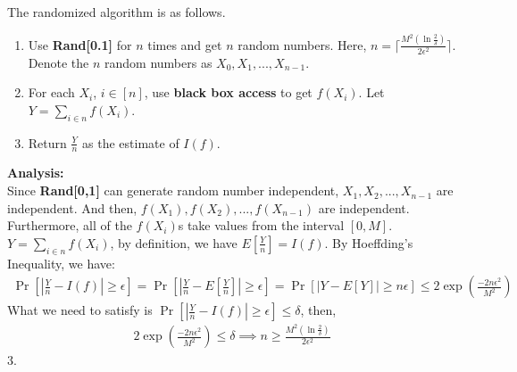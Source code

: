 The randomized algorithm is as follows.
\begin{enumerate}
    \item Use \textbf{Rand[0.1]} for $n$ times and get $n$ random numbers.
    Here, $n=\lceil \frac{M^2(\ln \frac{2}{\delta})}{2\epsilon^2}\rceil $.
    Denote the $n$ random numbers as $X_0, X_1, ..., X_{n-1}$.
    \item For each $X_i$, $i\in [n]$, use \textbf{black box access} to get $f(X_i)$.
    Let $Y=\sum_{i\in n}f(X_i)$.
    \item Return $\frac{Y}{n}$ as the estimate of $I(f)$.
\end{enumerate}
\textbf{Analysis:}\\
Since \textbf{Rand[0,1]} can generate random number independent,
$X_1, X_2,..., X_{n-1}$ are independent.
And then, $f(X_1), f(X_2),..., f(X_{n-1})$ are independent.
Furthermore, all of the $f(X_i)$s take values from the interval $[0, M]$.
$Y=\sum_{i\in n}f(X_i)$, by definition, we have $E[\frac{Y}{n}]=I(f)$.
By Hoeffding's Inequality, we have:
\begin{align}
    \nonumber \Pr[|\frac{Y}{n}-I(f)|\ge\epsilon]=\Pr[|\frac{Y}{n}-E[\frac{Y}{n}]|\ge\epsilon]
    =\Pr[|Y-E[Y]|\ge n\epsilon]\le 2\exp({\frac{-2n\epsilon^2}{M^2}})
\end{align}
What we need to satisfy is $\Pr[|\frac{Y}{n}-I(f)|\ge\epsilon]\le \delta$, then,
\begin{align}
    \nonumber 2\exp({\frac{-2n\epsilon^2}{M^2}}) \le \delta \implies n\ge \frac{M^2(\ln \frac{2}{\delta})}{2\epsilon^2}
\end{align}
3.
